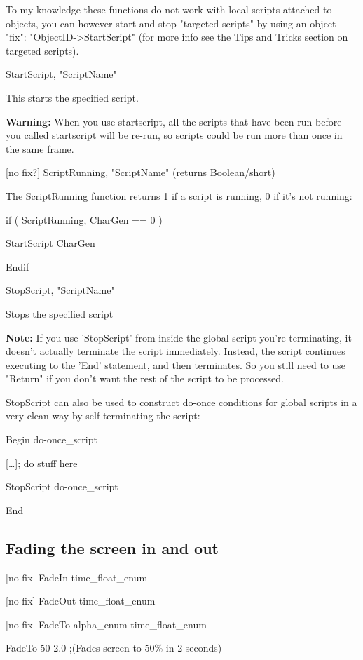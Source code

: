 \documentclass[
]{article}
\begin{document}
To my knowledge these functions do not work with local scripts attached
to objects, you can however start and stop "targeted scripts" by using
an object "fix": "ObjectID-\textgreater StartScript" (for more info see
the Tips and Tricks section on targeted scripts).

StartScript, "ScriptName"

This starts the specified script.

\textbf{Warning:} When you use startscript, all the scripts that have
been run before you called startscript will be re-run, so scripts could
be run more than once in the same frame.

{[}no fix?{]} ScriptRunning, "ScriptName" (returns Boolean/short)

The ScriptRunning function returns 1 if a script is running, 0 if it's
not running:

if ( ScriptRunning, CharGen == 0 )

StartScript CharGen

Endif

StopScript, "ScriptName"

Stops the specified script

\textbf{Note:} If you use 'StopScript' from inside the global script
you're terminating, it doesn't actually terminate the script
immediately. Instead, the script continues executing to the 'End'
statement, and then terminates. So you still need to use "Return" if you
don't want the rest of the script to be processed.

StopScript can also be used to construct do-once conditions for global
scripts in a very clean way by self-terminating the script:

Begin do-once\_script

{[}\ldots{]}; do stuff here

StopScript do-once\_script

End

\hypertarget{fading-the-screen-in-and-out}{%
\subsection{Fading the screen in and
out}\label{fading-the-screen-in-and-out}}

{[}no fix{]} FadeIn time\_float\_enum

{[}no fix{]} FadeOut time\_float\_enum

{[}no fix{]} FadeTo alpha\_enum time\_float\_enum

FadeTo 50 2.0 ;(Fades screen to 50\% in 2 seconds)
\end{document}
